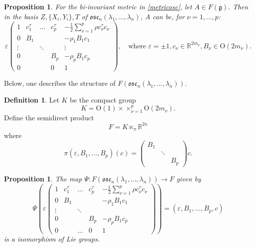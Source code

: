 \documentclass[11pt]{amsart}
\theoremstyle{plain}
\newtheorem{prop}[thm]{Proposition}
\theoremstyle{definition}
\newtheorem{defn}[thm]{Definition}
\theoremstyle{remark}
\begin{document}
    \begin{prop} For the bi-invariant metric in \eqref{metricosc}, let $A\in F(\mathfrak g)$. Then in the basis $Z, \{X_i, Y_i\}, T$ of $\mathfrak{osc}_n(\lambda_1, \hdots, \lambda_n)$, $A$ can be, for $\nu=1, \hdots, p$:
    	$$\varepsilon  \left( 
    	\begin{matrix} 
    	 1 &	c_1^{\tau}	&\hdots  &c_p^{\tau}   &   -\frac12 \sum_{\nu=1}^p  \rho c_{\nu}^{\tau} c_{\nu}\\
    0	 &	B_1 & & &  - \rho_1 B_1 c_1\\
    \vdots	&	& \ddots &   &  \vdots\\
    0	&	& & B_p &  - \rho_p B_1 c_p\\
   0 & & & 0 & 1
    	\end{matrix}\right), \quad \mbox{where } \varepsilon=\pm 1, c_{\nu}\in \mathbb R^{2m_{\nu}}, B_{\nu}\in \mathrm{O}(2 m_{\nu}).$$
    \end{prop}
Below, one describes the structure of $F(\mathfrak{osc}_n(\lambda_1, \hdots, \lambda_n))$.

\begin{defn} Let $K$ be the compact group 
	$$K= \mathrm{O}(1)\times \times_{\nu=1}^p \mathrm{O}(2m_{\nu}).$$
	Define the semidirect product
	$$F=K\ltimes_{\pi} \mathbb R^{2n}$$
	where 
	$$\pi(\varepsilon, B_1, \hdots, B_p)(c)=\left( \begin{matrix}
	B_1  & & \\
	 & \ddots & \\
	  & & B_p
	\end{matrix} \right) c.
	$$	
	\end{defn}
\begin{prop} The map $\Psi: F(\mathfrak{osc}_n(\lambda_1, \hdots, \lambda_n)) \to F$ given by
	$$\Psi \left( \varepsilon  \left( 
	\begin{matrix} 
	1&	c_1^{\tau}	&\hdots  &c_p^{\tau}   &   -\frac12 \sum_{\nu=1}^p  \rho c_{\nu}^{\tau} c_{\nu}\\
0&	B_1 & & &  - \rho_1 B_1 c_1\\
\vdots &	& \ddots &   &  \\
0&	& & B_p &  - \rho_p B_1 c_p\\
0  & &\hdots  & 0 & 1
	\end{matrix}\right) \right) =(\varepsilon, B_1, \hdots, B_p, c)$$
	is a isomorphism of Lie groups. 
\end{prop}
\end{document}
